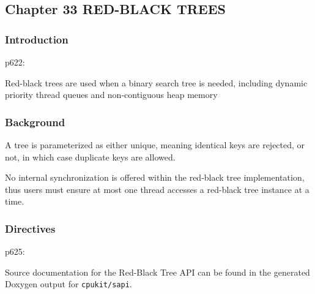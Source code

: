 \subsection{Chapter 33 RED-BLACK TREES}

\subsubsection{Introduction}

p622:

Red-black trees are used when a binary search tree is needed,
including dynamic priority thread queues and non-contiguous heap memory

\subsubsection{Background}

A tree is parameterized as either unique, meaning identical keys are rejected,
or not,
in which case duplicate keys are allowed.

No internal synchronization is offered within the red-black tree implementation,
thus users must ensure
at most one thread accesses a red-black tree instance at a time.

\subsubsection{Directives}
p625:

Source documentation for the Red-Black Tree API can be found
in the generated Doxygen output for \verb"cpukit/sapi".
